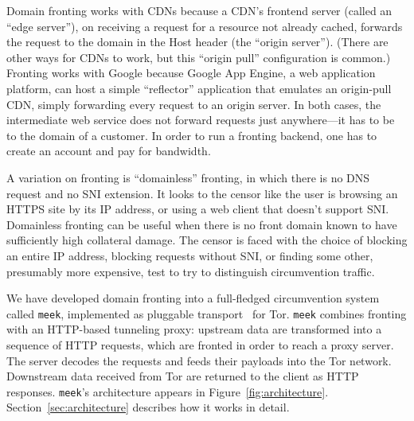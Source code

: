 \documentclass[conference]{IEEEtran}
\newcommand{\meek}{\texttt{meek}\xspace}
\begin{document}
Domain fronting works with CDNs because a CDN's frontend server
(called an ``edge server''),
on receiving a request for a resource not already cached,
forwards the request to the domain in the Host header
(the ``origin server'').
(There are other ways for CDNs to work, but this ``origin pull''
configuration is common.)
Fronting works with Google because Google App Engine, a web application platform,
can host a simple ``reflector'' application that emulates
an origin-pull CDN, simply forwarding every request to an origin server.
In both cases, the intermediate web service does not forward requests just anywhere---it
has to be to the domain of a customer.
In order to run a fronting backend,
one has to create an account and pay for bandwidth.

A variation on fronting is ``domainless'' fronting,
in which there is no DNS request and no SNI extension.
It looks to the censor
like the user is browsing an HTTPS site by its IP address,
or using a web client that doesn't support SNI.
Domainless fronting can be useful when there is no front domain
known to have sufficiently high collateral damage.
The censor is faced with the choice of blocking an entire IP address,
blocking requests without SNI,
or finding some other, presumably more expensive, test to try to distinguish
circumvention traffic.

We have developed domain fronting into a full-fledged circumvention system called \meek,
implemented as pluggable transport~\cite{pt} for Tor.
\meek combines fronting with an HTTP-based tunneling proxy:
upstream data are transformed into a sequence of HTTP requests,
which are fronted in order to reach a proxy server.
The server decodes the requests and feeds their payloads
into the Tor network.
Downstream data received from Tor
are returned to the client as HTTP responses.
\meek's architecture appears in Figure~\ref{fig:architecture}.
Section~\ref{sec:architecture} describes how it works in detail.
\end{document}
